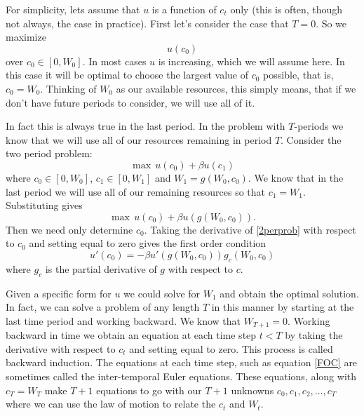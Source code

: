 For simplicity, lets assume that $u$ is a function of $c_t$ only (this is often, though not always, the case in practice). 
 First let's consider the case that $T=0$.  So we maximize
\begin{equation}\label{1perprob}
u(c_0)
\end{equation}
over $c_0 \in [0,W_0]$.  In most cases $u$ is increasing, which we will assume here.  In this case it will be optimal to choose
 the largest value of $c_0$ possible, that is, $c_0 = W_0$.  Thinking of $W_0$ as our available resources, this simply means, 
 that if we don't have future periods to consider, we will use all of it.

In fact this is always true in the last period.  In the problem with $T$-periods we know that we will use all of our resources 
remaining in period $T$.  Consider the two period problem:
\begin{equation}
\label{2perprob}
\max \, u(c_0) + \beta u(c_1)
\end{equation}
where $c_0 \in [0,W_0]$, $c_1 \in [0,W_1]$ and $W_1 = g(W_0,c_0)$.  We know that in the last period we will use all of our 
remaining resources so that $c_1 = W_1$.  Substituting gives
\begin{equation*}
\max \, u(c_0) + \beta u(g(W_0,c_0)).
\end{equation*}
Then we need only determine $c_0$.  Taking the derivative of \eqref{2perprob} with respect to $c_0$ and setting equal to zero 
gives the first order condition
\begin{equation}
\label{FOC}
u'(c_0) = -\beta u'(g(W_0,c_0))g_c(W_0,c_0)
\end{equation}
where $g_c$ is the partial derivative of $g$ with respect to $c$.

Given a specific form for $u$ we could solve for $W_1$ and obtain the optimal solution.  In fact, we can solve a problem of 
any length $T$ in this manner by starting at the last time period and working backward.  We know that $W_{T+1} = 0$.  Working 
backward in time we obtain an equation at each time step $t<T$ by taking the derivative with respect to $c_t$ and setting equal
 to zero.  This process is called backward induction.  The equations at each time step, such as equation \eqref{FOC} are 
 sometimes called the inter-temporal Euler equations.  These equations, along with $c_T = W_T$ make $T+1$ equations to go with 
 our $T+1$ unknowns $c_0,c_1,c_2,\ldots,c_T$ where we can use the law of motion to relate the $c_t$ and $W_t$.

